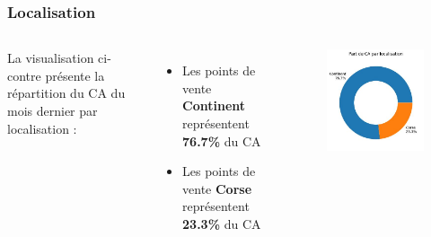 \documentclass{beamer}
\begin{document}
    \begin{frame}
        \tiny
        \frametitle{Localisation}

        \begin{columns}
                La visualisation ci-contre présente la répartition du CA du mois dernier par localisation :

                \begin{itemize}
                                            \item{Les points de vente \textbf{Continent} représentent \textbf{76.7\%} du CA}
                                            \item{Les points de vente \textbf{Corse} représentent \textbf{23.3\%} du CA}
                                    \end{itemize}

                \centering

                \begin{figure}[h]
                    \centering
                    \includegraphics[width=1\textwidth]{assets/ca_par_localisation}
                \end{figure}
        \end{columns}


\end{frame}
\end{document}

